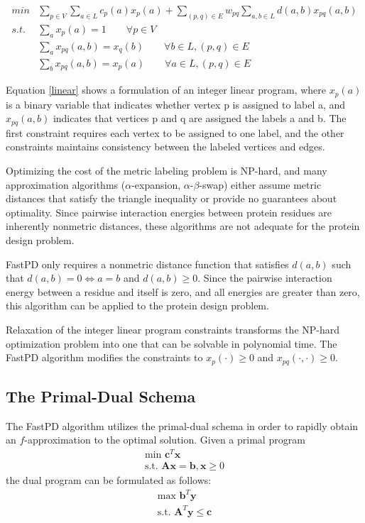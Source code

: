 \documentclass[11pt]{article}
\begin{document}
	\begin{equation}
		\begin{split}
		min & \sum_{p \in V} \sum_{a\in L} c_p(a)x_p(a)+ \sum_{(p,q) \in E} w_{pq}
		 \sum_{a,b \in L}d(a,b) x_{pq}(a,b)\\
		s.t. & \sum_a x_p(a) =1 \qquad \forall p \in V\\
		& \sum_a x_{pq}(a,b)=x_q(b) \qquad \forall b \in L, (p,q) \in E\\
		& \sum_b x_{pq}(a,b)=x_p(a) \qquad \forall a \in L, (p,q) \in E
		\end{split}
	\label{linear}
	\end{equation}
	
	Equation \ref{linear} shows a formulation of an integer linear program, where
	$x_p(a)$ is a binary variable that indicates whether vertex p is assigned to
	label a, and $x_{pq}(a,b)$ indicates that vertices p and q are assigned the
	labels a and b.  The first constraint requires each vertex to be assigned to
	one label, and the other constraints maintains consistency between the labeled
	vertices and edges.
	
	Optimizing the cost of the metric labeling problem is NP-hard, and many
	approximation algorithms ($\alpha$-expansion, $\alpha$-$\beta$-swap) either
	assume metric distances that satisfy the triangle inequality or provide no
	guarantees about optimality.  Since pairwise interaction energies between
	protein residues are inherently nonmetric distances, these algorithms are not
	adequate for the protein design problem.  
	
	FastPD only requires a nonmetric distance function that satisfies $d(a,b)$ such
	that $d(a,b)=0 \iff a=b$ and $d(a,b) \geq 0$.  Since the pairwise interaction
	energy between a residue and itself is zero, and all energies are greater than
	zero, this algorithm can be applied to the protein design problem.  
	
	Relaxation of the integer linear program constraints transforms the NP-hard
	optimization problem into one that can be solvable in polynomial time.  The 
	FastPD algorithm modifies the constraints to 
	$x_p(\cdot) \ge 0$ and $x_{pq}(\cdot, \cdot) \ge 0$.  

	\subsection{The Primal-Dual Schema}	
	
	The FastPD algorithm utilizes the primal-dual schema in order to rapidly obtain
	an $f$-approximation to the optimal solution. Given a primal program
	\begin{gather*}
	\text{min }\textbf{c}^T\textbf{x} \\
	\text{s.t. }\textbf{Ax} = \textbf{b}, \textbf{x} \geq 0
	\end{gather*}
	the dual program can be formulated as follows:
	\begin{gather*}
	\text{max } \textbf{b}^T\textbf{y} \\
	\text{s.t. }\textbf{A}^T\textbf{y} \leq \textbf{c} 
	\end{gather*}		
\end{document}
